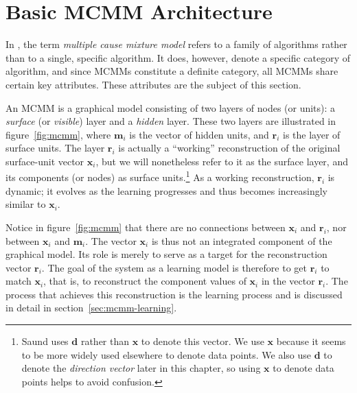 \section{Basic MCMM Architecture}
\label{sec:architecture}

In \citet{saund:94}, the term \emph{multiple cause mixture model} refers to a family of algorithms rather than to a single, 
specific algorithm. It does, however, denote a specific category of algorithm, and since
MCMMs constitute a definite category, 
all MCMMs share certain key attributes.
These attributes are 
the subject of this section. 

An MCMM is a graphical model consisting of two layers of nodes (or units): a \emph{surface} (or \emph{visible}) 
layer and a \emph{hidden} layer.
These two layers are illustrated in figure~\ref{fig:mcmm}, where $\mathbf{m}_i$ 
is the vector of hidden units, and $\mathbf{r}_i$ is the layer of surface units. The layer $\mathbf{r}_i$ is actually a  ``working'' reconstruction of the original surface-unit vector $\mathbf{x}_i$, but we will nonetheless refer to it as the surface layer, and its components (or nodes) as surface units.\footnote{Saund 
uses $\mathbf{d}$ 
rather than $\mathbf{x}$ to denote this vector. We use $\mathbf{x}$ because it seems to be more widely
used elsewhere to denote data points. We also use $\mathbf{d}$ to denote the \emph{direction vector} later in this chapter, so using $\mathbf{x}$ to denote data points helps to avoid confusion.}
As a working
reconstruction, $\mathbf{r}_i$ is dynamic; it evolves as the learning progresses and thus
becomes increasingly similar to $\mathbf{x}_i$. 

Notice in figure~\ref{fig:mcmm} that there are no connections between $\mathbf{x}_i$ and $\mathbf{r}_i$, nor between 
$\mathbf{x}_i$ and $\mathbf{m}_i$. The vector $\mathbf{x}_i$ is thus not an integrated component of the graphical 
model. Its role is merely to serve as a target for the reconstruction vector $\mathbf{r}_i$. 
The goal of the system as a learning model is therefore to get $\mathbf{r}_i$ to 
match $\mathbf{x}_i$, that is, to reconstruct the component values of $\mathbf{x}_i$ in 
the vector $\mathbf{r}_i$. The process that achieves this reconstruction is the learning process and is discussed in detail in section~\ref{sec:mcmm-learning}.

